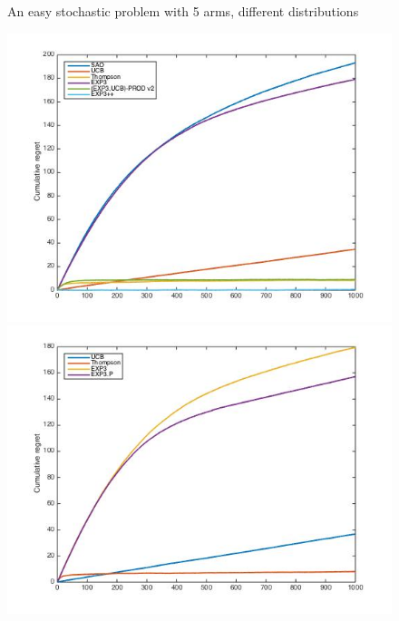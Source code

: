 \documentclass[10.5pt]{article}
\begin{document}
\begin{figure}[H]
  \label{fig:awesome_image3}
\endminipage
\caption{An easy stochastic problem with 5 arms, different distributions}
\end{figure}

\begin{figure}[H]
  \includegraphics[width=\linewidth]{Stoch2_mix.jpg}
  \label{fig:awesome_image1}
\endminipage\hfill
{}
  \includegraphics[width=\linewidth]{Stoch2_old.jpg}
  \label{fig:awesome_image2}
\endminipage\hfill
{}%

\end{figure}
\end{document}

